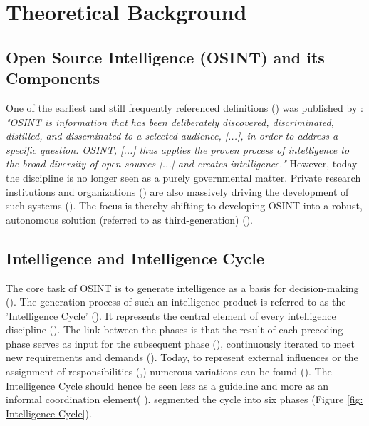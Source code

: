 \documentclass[10pt]{article}
\begin{document}
\section{Theoretical Background} \label{sec:theoreticalbackground}


\subsection{Open Source Intelligence (OSINT) and its Components}

One of the earliest and still frequently referenced definitions (\cite{DosPassos.2017})
was published by \textcite{NorthAtlanticTreatyOrganization.2001}: \textit{"OSINT is information that has been
    deliberately discovered, discriminated, distilled, and disseminated to a selected audience,
    [...], in order to address a specific question. OSINT, [...] thus applies the proven
    process of intelligence to the broad diversity of open sources [...] and creates
    intelligence."} However, today the discipline is no longer seen as a purely governmental
matter. Private research institutions and organizations (\cite{Bohm.2021,Mercado.2005}) are
also massively driving the development of such systems
(\cite{Dokman.2020, Ghioni.2023}). The focus is thereby shifting to
developing OSINT into a robust, autonomous solution (referred to as third-generation) (\cite{PastorGalindo.2019}).

\subsection{Intelligence and Intelligence Cycle}

The core task of OSINT is to generate intelligence as a basis for decision-making
(\cite{Breakspear.2013,NorthAtlanticTreatyOrganization.2001}). The generation process of such an intelligence product
is referred to as the 'Intelligence Cycle' (\cite{CentralIntelligenceAgency.1987}).
It represents the central element of every intelligence discipline (\cite{Reuser.2017}).
The link between the phases is that the result of each preceding phase serves as input for the subsequent phase (\cite{JointChiefsofStaffU.S.Army.2013}), continuously iterated to meet new requirements and demands (\cite{Gibson.2016}).
Today, to represent external influences or the assignment of responsibilities (\cite{Lowenthal.2020,Phythian.2013},) numerous
variations can be found (\cite{Reuser.2017}). The Intelligence Cycle should hence be seen less as a guideline and more as an informal
coordination element( \cite{Hwang.2022}). \textcite{JointChiefsofStaffU.S.Army.2013} segmented the cycle into six phases  (Figure \ref{fig: Intelligence Cycle}).
\end{document}

